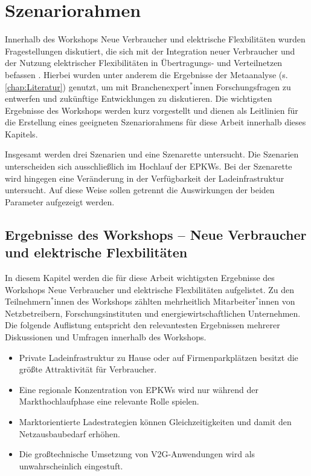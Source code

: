 
\section{Szenariorahmen}\label{chap:Szenariorahmen}

Innerhalb des Workshops \glqq Neue Verbraucher und elektrische Flexbilitäten\grqq{} wurden Fragestellungen diskutiert, die sich mit der Integration neuer Verbraucher und der Nutzung elektrischer Flexibilitäten in Übertragungs- und Verteilnetzen befassen \cite{RLI2020}.
Hierbei wurden unter anderem die Ergebnisse der Metaanalyse (s. \autoref{chap:Literatur}) genutzt, um mit Branchenexpert$^*$innen Forschungsfragen zu entwerfen und zukünftige Entwicklungen zu diskutieren.
Die wichtigsten Ergebnisse des Workshops werden kurz vorgestellt und dienen als Leitlinien für die Erstellung eines geeigneten Szenariorahmens für diese Arbeit innerhalb dieses Kapitels.\medskip

Insgesamt werden drei Szenarien und eine Szenarette untersucht.
Die Szenarien unterscheiden sich ausschließlich im Hochlauf der \glspl{EPKW}.
Bei der Szenarette wird hingegen eine Veränderung in der Verfügbarkeit der Ladeinfrastruktur untersucht.
Auf diese Weise sollen getrennt die Auswirkungen der beiden Parameter aufgezeigt werden.


\subsection{Ergebnisse des Workshops {--} Neue Verbraucher und elektrische Flexbilitäten}

In diesem Kapitel werden die für diese Arbeit wichtigsten Ergebnisse des Workshops \glqq Neue Verbraucher und elektrische Flexbilitäten\grqq{} aufgelistet.
Zu den Teilnehmern$^*$innen des Workshops zählten mehrheitlich Mitarbeiter$^*$innen von Netzbetreibern, Forschungsinstituten und energiewirtschaftlichen Unternehmen.
Die folgende Auflistung entspricht den relevantesten Ergebnissen mehrerer Diskussionen und Umfragen innerhalb des Workshops.

\begin{itemize}
	\item Private Ladeinfrastruktur zu Hause oder auf Firmenparkplätzen besitzt die größte Attraktivität für Verbraucher.
	\item Eine regionale Konzentration von \glspl{EPKW} wird nur während der Markthochlaufphase eine relevante Rolle spielen.
	\item Marktorientierte Ladestrategien können Gleichzeitigkeiten und damit den Netzausbaubedarf erhöhen.
	\item Die großtechnische Umsetzung von \gls{V2G}-Anwendungen wird als unwahrscheinlich eingestuft.
	
\end{itemize}


